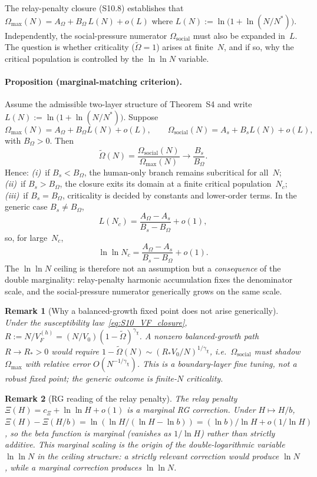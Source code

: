 \documentclass[11pt]{article}
\newtheorem{remark}{Remark}
\begin{document}
The relay-penalty closure (S10.8) establishes that $\Omega_{\max}(N) = A_\Omega + B_\Omega\,L(N) + o(L)$ where $L(N) := \ln\!\bigl(1+\ln(N/N^*)\bigr)$.
Independently, the social-pressure numerator $\Omega_{\mathrm{social}}$ must also be expanded in~$L$. The question is whether criticality ($\tilde\Omega = 1$) arises at finite~$N$, and if so, why the critical population is controlled by the $\ln\!\ln N$ variable.

\paragraph{Proposition (marginal-matching criterion).}
Assume the admissible two-layer structure of Theorem~S4 and write $L(N):=\ln\!\bigl(1+\ln(N/N^*)\bigr)$. Suppose
\[
\Omega_{\max}(N)=A_\Omega+B_\Omega L(N)+o(L),
\qquad
\Omega_{\mathrm{social}}(N)=A_s+B_sL(N)+o(L),
\]
with $B_\Omega>0$.  Then
\[
\tilde\Omega(N)
=\frac{\Omega_{\mathrm{social}}(N)}{\Omega_{\max}(N)}
\longrightarrow \frac{B_s}{B_\Omega}.
\]
Hence:
\emph{(i)}~if $B_s<B_\Omega$, the human-only branch remains subcritical for all~$N$;
\emph{(ii)}~if $B_s>B_\Omega$, the closure exits its domain at a finite critical population~$N_c$;
\emph{(iii)}~if $B_s=B_\Omega$, criticality is decided by constants and lower-order terms.
In the generic case $B_s\neq B_\Omega$,
\[
L(N_c)=\frac{A_\Omega-A_s}{B_s-B_\Omega}+o(1),
\]
so, for large~$N_c$,
\[
\ln\!\ln N_c=\frac{A_\Omega-A_s}{B_s-B_\Omega}+o(1).
\]
The $\ln\!\ln N$ ceiling is therefore not an assumption but a \emph{consequence} of the double marginality: relay-penalty harmonic accumulation fixes the denominator scale, and the social-pressure numerator generically grows on the same scale.

\begin{remark}[Why a balanced-growth fixed point does not arise generically]
Under the susceptibility law~\eqref{eq:S10_VF_closure},
$R:=N/V_F^{(h)}=(N/V_0)(1-\tilde\Omega)^{\gamma_\chi}$.
A nonzero balanced-growth path $R\to R_*>0$ would require
$1-\tilde\Omega(N)\sim (R_*V_0/N)^{1/\gamma_\chi}$,
i.e.\ $\Omega_{\mathrm{social}}$ must shadow $\Omega_{\max}$ with relative error
$O(N^{-1/\gamma_\chi})$.  This is a boundary-layer fine tuning, not a robust fixed point; the generic outcome is finite-$N$ criticality.
\end{remark}

\begin{remark}[RG reading of the relay penalty]
The relay penalty $\Xi(H)=c_\Xi+\ln\!\ln H+o(1)$ is a marginal RG correction.
Under $H\mapsto H/b$,
$\Xi(H)-\Xi(H/b) = \ln(\ln H / (\ln H - \ln b)) = (\ln b)/\ln H + o(1/\ln H)$,
so the beta function is marginal (vanishes as $1/\ln H$) rather than strictly additive.
This marginal scaling is the origin of the double-logarithmic variable $\ln\!\ln N$ in the ceiling structure: a strictly relevant correction would produce $\ln N$, while a marginal correction produces $\ln\!\ln N$.
\end{remark}
\end{document}
